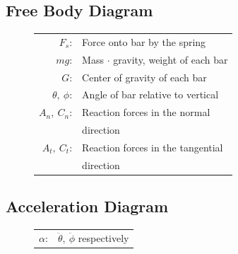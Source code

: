 \documentclass[12pt]{report}
\begin{document}
\begin{flushleft}
\section{Free Body Diagram}
\begin{figure}[ht]
   \begin{minipage}[c]{.225\textwidth}
      
   \end{minipage}%
   \begin{minipage}[c]{.55\textwidth}
     \center
     \begin{tabular}{rl}
     $F_s$:&Force onto bar by the spring\\
     $mg$:&Mass $\cdot$ gravity, weight of each bar\\
     $G$:&Center of gravity of each bar\\
     $\theta,~\phi$:& Angle of bar relative to vertical\\
     $A_n,~C_n$:& Reaction forces in the normal \\ & direction \\
     $A_t,~C_t$:& Reaction forces in the tangential \\ & direction \\
   \end{tabular}
   \end{minipage}%
  \begin{minipage}[c]{.225\textwidth}
    \vspace{2.8ex}
    \hspace{2ex}
     
  \end{minipage}
\end{figure}

\subsection*{Acceleration Diagram}
\begin{figure}[ht]
   \begin{minipage}[c]{.25\textwidth}
      
   \end{minipage}%
   \begin{minipage}[c]{.5\textwidth}
     \center
     \begin{tabular}{rl}
     $\alpha$:& $\ddot{\theta},~\ddot{\phi}$ respectively\\
   \end{tabular}
   \end{minipage}%
  \begin{minipage}[c]{.25\textwidth}
    \hspace{2ex}
     
  \end{minipage}
\end{figure}


\end{flushleft}
\end{document}
